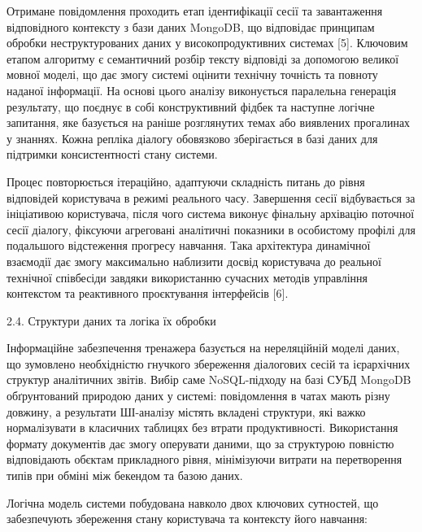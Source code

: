 \documentclass[
]{article}
\begin{document}
Отримане повідомлення проходить етап ідентифікації сесії та завантаження
відповідного контексту з бази даних MongoDB, що відповідає принципам
обробки неструктурованих даних у високопродуктивних системах {[}5{]}.
Ключовим етапом алгоритму є семантичний розбір тексту відповіді за
допомогою великої мовної моделі, що дає змогу системі оцінити технічну
точність та повноту наданої інформації. На основі цього аналізу
виконується паралельна генерація результату, що поєднує в собі
конструктивний фідбек та наступне логічне запитання, яке базується на
раніше розглянутих темах або виявлених прогалинах у знаннях. Кожна
репліка діалогу обов\textquotesingle язково зберігається в базі даних
для підтримки консистентності стану системи.

Процес повторюється ітераційно, адаптуючи складність питань до рівня
відповідей користувача в режимі реального часу. Завершення сесії
відбувається за ініціативою користувача, після чого система виконує
фінальну архівацію поточної сесії діалогу, фіксуючи агреговані
аналітичні показники в особистому профілі для подальшого відстеження
прогресу навчання. Така архітектура динамічної взаємодії дає змогу
максимально наблизити досвід користувача до реальної технічної
співбесіди завдяки використанню сучасних методів управління контекстом
та реактивного проєктування інтерфейсів {[}6{]}.

\protect{}\label{_Toc228981062}{}2.4. Структури даних та
логіка їх обробки

Інформаційне забезпечення тренажера базується на нереляційній моделі
даних, що зумовлено необхідністю гнучкого збереження діалогових сесій та
ієрархічних структур аналітичних звітів. Вибір саме NoSQL-підходу на
базі СУБД MongoDB обґрунтований природою даних у системі: повідомлення в
чатах мають різну довжину, а результати ШІ-аналізу містять вкладені
структури, які важко нормалізувати в класичних таблицях без втрати
продуктивності. Використання формату документів дає змогу оперувати
даними, що за структурою повністю відповідають об\textquotesingle єктам
прикладного рівня, мінімізуючи витрати на перетворення типів при обміні
між бекендом та базою даних.

Логічна модель системи побудована навколо двох ключових сутностей, що
забезпечують збереження стану користувача та контексту його навчання:
\end{document}
